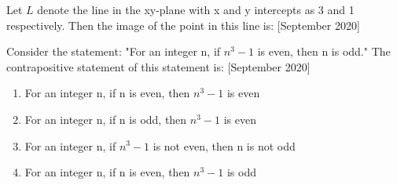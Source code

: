     \item Let $L$ denote the line in the xy-plane with x and y intercepts as 3 and 1 respectively. Then the image of the point  in this line is: \hfill{[September 2020]}
    \begin{enumerate}
    \begin{multicols}{2}
        \item {}
        \columnbreak
        \item {}
        \end{multicols}
        \begin{multicols}{2}
        \item {}
        \item {}
        \end{multicols}
       \end{enumerate}

 
 \item Consider the statement: "For an integer n, if $n^3-1$ is even, then n is odd." The contrapositive statement of this statement is: \hfill{[September 2020]}
 \begin{enumerate}
     \item For an integer n, if n is even, then $n^3-1$ is even
     \item For an integer n, if n is odd, then $n^3-1$ is even
     \item For an integer n, if $n^3-1$ is not even, then n is not odd
     \item For an integer n, if n is even, then $n^3-1$ is odd
 \end{enumerate}

